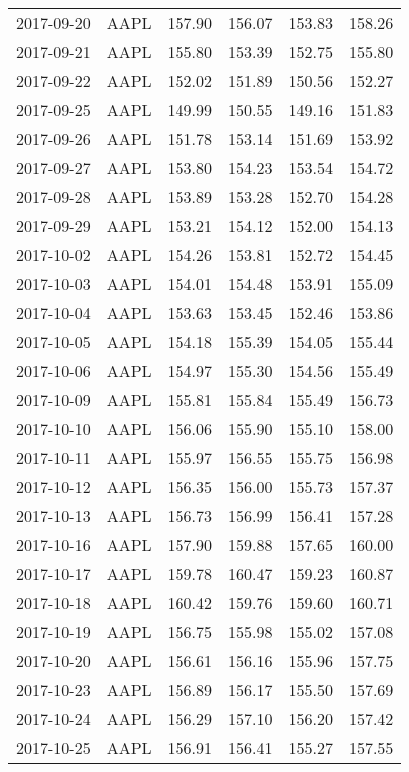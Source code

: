 \documentclass[12pt,a4paper]{report}
\begin{document}
\begin{appendices}
\begin{longtable}{llllll}
  2017-09-20 & AAPL & 157.90 & 156.07 & 153.83 & 158.26 \\ 
  2017-09-21 & AAPL & 155.80 & 153.39 & 152.75 & 155.80 \\ 
  2017-09-22 & AAPL & 152.02 & 151.89 & 150.56 & 152.27 \\ 
  2017-09-25 & AAPL & 149.99 & 150.55 & 149.16 & 151.83 \\ 
  2017-09-26 & AAPL & 151.78 & 153.14 & 151.69 & 153.92 \\ 
  2017-09-27 & AAPL & 153.80 & 154.23 & 153.54 & 154.72 \\ 
  2017-09-28 & AAPL & 153.89 & 153.28 & 152.70 & 154.28 \\ 
  2017-09-29 & AAPL & 153.21 & 154.12 & 152.00 & 154.13 \\ 
  2017-10-02 & AAPL & 154.26 & 153.81 & 152.72 & 154.45 \\ 
  2017-10-03 & AAPL & 154.01 & 154.48 & 153.91 & 155.09 \\ 
  2017-10-04 & AAPL & 153.63 & 153.45 & 152.46 & 153.86 \\ 
  2017-10-05 & AAPL & 154.18 & 155.39 & 154.05 & 155.44 \\ 
  2017-10-06 & AAPL & 154.97 & 155.30 & 154.56 & 155.49 \\ 
  2017-10-09 & AAPL & 155.81 & 155.84 & 155.49 & 156.73 \\ 
  2017-10-10 & AAPL & 156.06 & 155.90 & 155.10 & 158.00 \\ 
  2017-10-11 & AAPL & 155.97 & 156.55 & 155.75 & 156.98 \\ 
  2017-10-12 & AAPL & 156.35 & 156.00 & 155.73 & 157.37 \\ 
  2017-10-13 & AAPL & 156.73 & 156.99 & 156.41 & 157.28 \\ 
  2017-10-16 & AAPL & 157.90 & 159.88 & 157.65 & 160.00 \\ 
  2017-10-17 & AAPL & 159.78 & 160.47 & 159.23 & 160.87 \\ 
  2017-10-18 & AAPL & 160.42 & 159.76 & 159.60 & 160.71 \\ 
  2017-10-19 & AAPL & 156.75 & 155.98 & 155.02 & 157.08 \\ 
  2017-10-20 & AAPL & 156.61 & 156.16 & 155.96 & 157.75 \\ 
  2017-10-23 & AAPL & 156.89 & 156.17 & 155.50 & 157.69 \\ 
  2017-10-24 & AAPL & 156.29 & 157.10 & 156.20 & 157.42 \\ 
  2017-10-25 & AAPL & 156.91 & 156.41 & 155.27 & 157.55 \\ 

\end{longtable}
\end{appendices}
\end{document}
